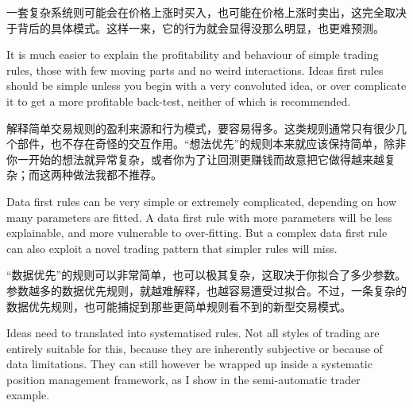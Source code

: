\begin{chineseblock}一套复杂系统则可能会在价格上涨时买入，也可能在价格上涨时卖出，这完全取决于背后的具体模式。这样一来，它的行为就会显得没那么明显，也更难预测。\end{chineseblock}


\begin{englishblock} It is much easier to explain the profitability and behaviour of simple trading rules, those with few moving parts and no weird interactions. Ideas first rules should be simple unless you begin with a very convoluted idea, or over complicate it to get a more profitable back-test, neither of which is recommended. \end{englishblock}

\begin{chineseblock}解释简单交易规则的盈利来源和行为模式，要容易得多。这类规则通常只有很少几个部件，也不存在奇怪的交互作用。“想法优先”的规则本来就应该保持简单，除非你一开始的想法就异常复杂，或者你为了让回测更赚钱而故意把它做得越来越复杂；而这两种做法我都不推荐。\end{chineseblock}

\bipairgap

\begin{englishblock} Data first rules can be very simple or extremely complicated, depending on how many parameters are fitted. A data first rule with more parameters will be less explainable, and more vulnerable to over-fitting. But a complex data first rule can also exploit a novel trading pattern that simpler rules will miss. \end{englishblock}

\begin{chineseblock}“数据优先”的规则可以非常简单，也可以极其复杂，这取决于你拟合了多少参数。参数越多的数据优先规则，就越难解释，也越容易遭受过拟合。不过，一条复杂的数据优先规则，也可能捕捉到那些更简单规则看不到的新型交易模式。\end{chineseblock}


\begin{englishblock} Ideas need to translated into systematised rules. Not all styles of trading are entirely suitable for this, because they are inherently subjective or because of data limitations. They can still however be wrapped up inside a systematic position management framework, as I show in the semi-automatic trader example. \end{englishblock}

